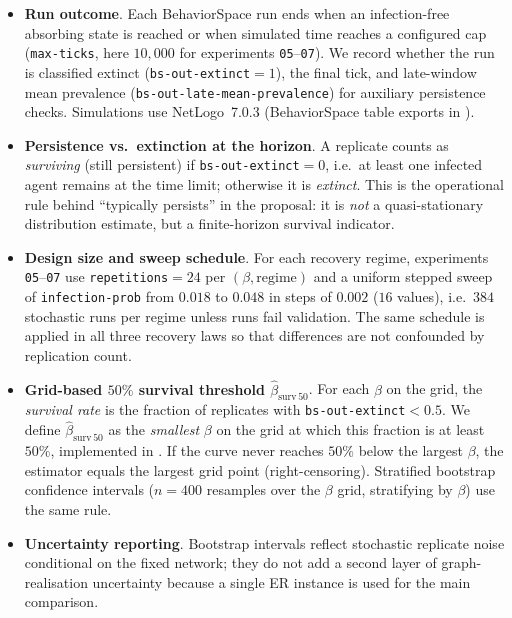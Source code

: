\documentclass[11pt,a4paper]{article}
\begin{document}
\begin{itemize}[leftmargin=*]
  \item \textbf{Run outcome}. Each BehaviorSpace run ends when an infection-free absorbing state is reached or when simulated time reaches a configured cap (\texttt{max-ticks}, here $10{,}000$ for experiments \texttt{05}--\texttt{07}). We record whether the run is classified extinct (\texttt{bs-out-extinct}${}=1$), the final tick, and late-window mean prevalence (\texttt{bs-out-late-mean-prevalence}) for auxiliary persistence checks. Simulations use NetLogo~7.0.3 (BehaviorSpace table exports in ).

  \item \textbf{Persistence vs.\ extinction at the horizon}. A replicate counts as \emph{surviving} (still persistent) if \texttt{bs-out-extinct}${}=0$, i.e.\ at least one infected agent remains at the time limit; otherwise it is \emph{extinct}. This is the operational rule behind ``typically persists'' in the proposal: it is \emph{not} a quasi-stationary distribution estimate, but a finite-horizon survival indicator.

  \item \textbf{Design size and sweep schedule}. For each recovery regime, experiments \texttt{05}--\texttt{07} use \texttt{repetitions}${}=24$ per $(\beta,\text{regime})$ and a uniform stepped sweep of \texttt{infection-prob} from $0.018$ to $0.048$ in steps of $0.002$ ($16$ values), i.e.\ $384$ stochastic runs per regime unless runs fail validation. The same schedule is applied in all three recovery laws so that differences are not confounded by replication count.

  \item \textbf{Grid-based $50\%$ survival threshold $\hat{\beta}_{\mathrm{surv}\,50}$}. For each $\beta$ on the grid, the \emph{survival rate} is the fraction of replicates with \texttt{bs-out-extinct}${}<0.5$. We define $\hat{\beta}_{\mathrm{surv}\,50}$ as the \emph{smallest} $\beta$ on the grid at which this fraction is at least $50\%$, implemented in . If the curve never reaches $50\%$ below the largest $\beta$, the estimator equals the largest grid point (right-censoring). Stratified bootstrap confidence intervals ($n{=}400$ resamples over the $\beta$ grid, stratifying by $\beta$) use the same rule.

  \item \textbf{Uncertainty reporting}. Bootstrap intervals reflect stochastic replicate noise conditional on the fixed network; they do not add a second layer of graph-realisation uncertainty because a single ER instance is used for the main comparison.


\end{itemize}
\end{document}
